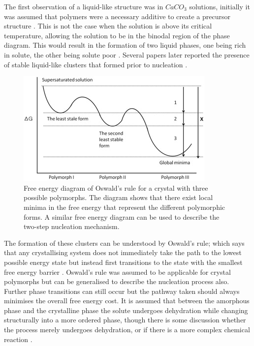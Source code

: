 The first observation of a liquid-like structure was in 
$CaCO_3$ solutions, initially it was assumed that polymers
were a necessary additive to create a precursor structure 
\cite{Driessche2017, Karthika2016}. This is not the case when 
the solution is above its critical temperature, allowing the 
solution to be in the binodal region of the phase diagram. 
This would result in the formation of two liquid phases, 
one being rich in solute, the other being solute poor 
\cite{Karthika2016, Fu2021}. Several papers later reported 
the presence of stable liquid-like clusters that formed 
prior to nucleation \cite{Savage2009, Wolde1997, Soga1999}. 

\begin{figure}
	\centering
	\includegraphics[width=\linewidth]{oswalds_rule.jpg}
	\caption{Free energy diagram of Oswald's rule for a 
		crystal with three possible polymorphs. The diagram 
		shows that there exist local minima in the free energy 
		that represent the different polymorphic forms. A similar
		free energy diagram can be used to describe the two-step
		nucleation mechanism.}
\end{figure}

The formation of these clusters can be understood by Oswald's 
rule; which says that any crystallising system does not 
immediately take the path to the lowest possible energy state 
but instead first transitions to the state with the smallest 
free energy barrier \cite{Ostwald1897}. Oswald's rule was 
assumed to be applicable for crystal polymorphs but can be
generalised to describe the nucleation process also. Further phase 
transitions can still occur but the pathway taken should 
always minimises the overall free energy cost. It is assumed
that between the amorphous phase and the crystalline phase 
the solute undergoes dehydration while changing structurally 
into a more ordered phase, though there is some discussion 
whether the process merely undergoes dehydration, or if there 
is a more complex chemical reaction
\cite{Karthika2016}.

